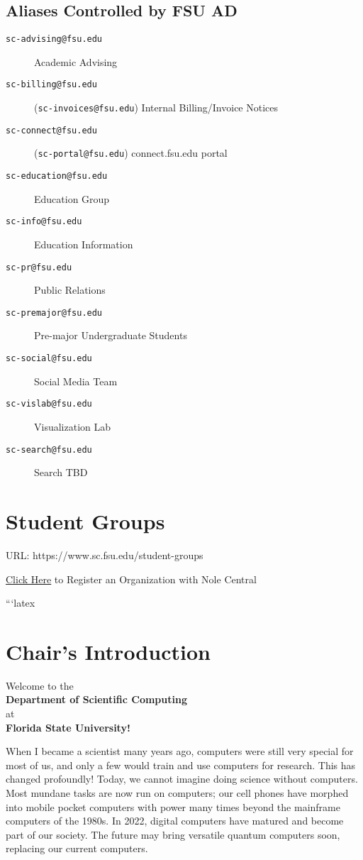 \documentclass[12pt,a4paper]{article}
\begin{document}
\subsection{Aliases Controlled by FSU AD}
\begin{description}
    \item[\texttt{sc-advising@fsu.edu}] Academic Advising
    \item[\texttt{sc-billing@fsu.edu}] (\texttt{sc-invoices@fsu.edu}) Internal Billing/Invoice Notices
    \item[\texttt{sc-connect@fsu.edu}] (\texttt{sc-portal@fsu.edu}) connect.fsu.edu portal
    \item[\texttt{sc-education@fsu.edu}] Education Group
    \item[\texttt{sc-info@fsu.edu}] Education Information
    \item[\texttt{sc-pr@fsu.edu}] Public Relations
    \item[\texttt{sc-premajor@fsu.edu}] Pre-major Undergraduate Students
    \item[\texttt{sc-social@fsu.edu}] Social Media Team
    \item[\texttt{sc-vislab@fsu.edu}] Visualization Lab
    \item[\texttt{sc-search@fsu.edu}] Search TBD
\end{description}

\section{Student Groups}
URL: https://www.sc.fsu.edu/student-groups
\newline

\href{https://nolecentral.dsa.fsu.edu/home_login}{Click Here} to Register an Organization with Nole Central

```latex
\section{Chair's Introduction}

\begin{center}
    Welcome to the \\
    \textbf{Department of Scientific Computing} \\
    at \\
    \textbf{Florida State University!}
\end{center}

When I became a scientist many years ago, computers were still very special for most of us, and only a few would train and use computers for research. This has changed profoundly! Today, we cannot imagine doing science without computers. Most mundane tasks are now run on computers; our cell phones have morphed into mobile pocket computers with power many times beyond the mainframe computers of the 1980s. In 2022, digital computers have matured and become part of our society. The future may bring versatile quantum computers soon, replacing our current computers.
\end{document}
